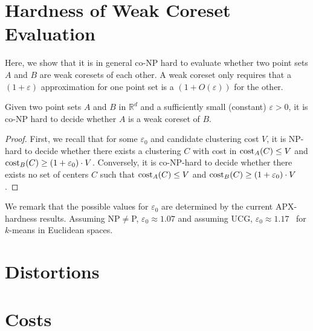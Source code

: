 \section{Hardness of Weak Coreset Evaluation}

Here, we show that it is in general co-NP hard to evaluate whether two point sets $A$ and $B$ are weak coresets of each other. A weak coreset only requires that a $(1+\varepsilon)$ approximation for one point set is a $(1+O(\varepsilon))$ for the other.


\begin{proposition}
\label{prop:hardness}
Given two point sets $A$ and $B$ in $\mathbb{R}^d$ and a sufficiently small (constant) $\varepsilon>0$, it is co-NP hard to decide whether $A$ is a weak coreset of $B$.
\end{proposition}
\begin{proof}
First, we recall that for some $\varepsilon_0$ and candidate clustering cost $V$, it is NP-hard to decide whether there exists a clustering $C$ with cost in $\text{cost}_A(C)\leq V$ and $\text{cost}_B(C)\geq (1+\varepsilon_0)\cdot V$.
Conversely, it is co-NP-hard to decide whether there exists no set of centers $C$ such that $\text{cost}_A(C)\leq V$ and $\text{cost}_B(C) \geq (1+\varepsilon_0)\cdot V$.
\end{proof}

We remark that the possible values for $\varepsilon_0$ are determined by the current APX-hardness results. Assuming NP$\neq$P, $\varepsilon_0\approx 1.07$ and assuming UCG, $\varepsilon_0 \approx 1.17$~\cite{Cohen-AddadSL21,Cohen-AddadS19} for $k$-means in Euclidean spaces.





















\section{Distortions}
\label{sec:distortions-tables}







\section{Costs}
\label{sec:costs-table}

